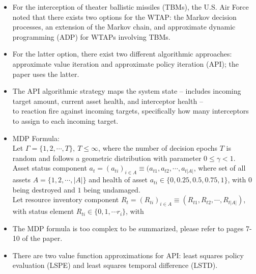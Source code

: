 \documentclass[12pt]{article} %
\renewcommand\le{\leqslant}
\begin{document}
\begin{itemize}
    \item For the interception of theater ballistic missiles (TBMs), the U.S. Air Force noted that there exists two options for the WTAP: the Markov decision processes, an extension of the Markov chain, and approximate dynamic programming (ADP) for WTAPs involving TBMs.
    \item For the latter option, there exist two different algorithmic approaches: approximate value iteration and approximate policy iteration (API); the paper uses the latter.
    \item The API algorithmic strategy maps the system state -- includes incoming target amount, current asset health, and interceptor health -- \\ to reaction fire against incoming targets, specifically how many interceptors to assign to each incoming target.
    \item MDP Formula:\\
    Let $\Gamma = \{1, 2, \cdots, T\},\ T \le \infty$, where the number of decision epochs $T$ is random and follows a geometric distribution with parameter $0 \le \gamma < 1$. \\Asset status component $a_t = (a_{ti})_{i\in A}\equiv (a_{t1}, a_{t2}, \cdots, a_{t|A|}$, where set of all assets $A = \{1, 2, \cdots, |A|\}$ and health of asset $a_{ti} \in \{0, 0.25, 0.5, 0.75, 1\}$, with $0$ being destroyed and $1$ being undamaged. \\
    Let resource inventory component $R_t = (R_{ti})_{i\in A} \equiv (R_{t1}, R_{t2}, \cdots, R_{t|A|})$, with status element $R_{ti} \in \{0,1,\cdots r_i\}$, with
    \item The MDP formula is too complex to be summarized, please refer to pages 7-10 of the paper.
    \item There are two value function approximations for API: least squares policy evaluation (LSPE) and least squares temporal difference (LSTD).\\
    \vspace{-0.25cm}

\end{itemize}
\end{document}
